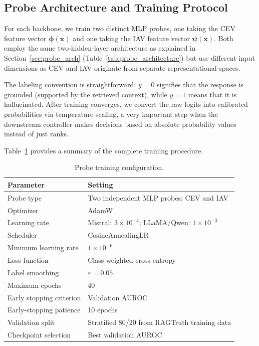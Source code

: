 \subsection{Probe Architecture and Training Protocol}
\label{sec:training_protocol}

For each backbone, we train two distinct MLP probes, one taking the CEV feature vector $\boldsymbol{\phi}(\mathbf{x})$ and one taking the IAV feature vector $\boldsymbol{\psi}(\mathbf{x})$. Both employ the same two-hidden-layer architecture as explained in Section~\ref{sec:probe_arch} (Table~\ref{tab:probe_architecture}) but use different input dimensions as CEV and IAV originate from separate representational spaces.

The labeling convention is straightforward: $y = 0$ signifies that the response is grounded (supported by the retrieved context), while $y = 1$ means that it is hallucinated. After training converges, we convert the raw logits into calibrated probabilities via temperature scaling, a very important step when the downstream controller makes decisions based on absolute probability values instead of just ranks.

Table~\ref{tab:training_config} provides a summary of the complete training procedure.

\begin{table}[!htb]
\centering
\caption{Probe training configuration.}
\label{tab:training_config}
\begin{tabular}{@{}ll@{}}
\toprule
\textbf{Parameter} & \textbf{Setting} \\
\midrule
Probe type              & Two independent MLP probes: CEV and IAV \\
Optimizer               & AdamW \\
Learning rate           & Mistral: $3 \times 10^{-4}$;\; LLaMA/Qwen: $1 \times 10^{-3}$ \\
Scheduler               & CosineAnnealingLR \\
Minimum learning rate   & $1 \times 10^{-6}$ \\
Loss function           & Class-weighted cross-entropy \\
Label smoothing         & $\varepsilon = 0.05$ \\
Maximum epochs          & 40 \\
Early stopping criterion & Validation AUROC \\
Early-stopping patience & 10 epochs \\
Validation split        & Stratified 80/20 from RAGTruth training data \\
Checkpoint selection    & Best validation AUROC \\
\bottomrule
\end{tabular}
\end{table}

